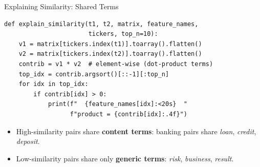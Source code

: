 \documentclass[aspectratio=169,11pt]{beamer}
\begin{document}
\begin{frame}[fragile]{Explaining Similarity: Shared Terms}

\begin{lstlisting}
def explain_similarity(t1, t2, matrix, feature_names,
                       tickers, top_n=10):
    v1 = matrix[tickers.index(t1)].toarray().flatten()
    v2 = matrix[tickers.index(t2)].toarray().flatten()
    contrib = v1 * v2  # element-wise (dot-product terms)
    top_idx = contrib.argsort()[::-1][:top_n]
    for idx in top_idx:
        if contrib[idx] > 0:
            print(f"  {feature_names[idx]:<20s}  "
                  f"product = {contrib[idx]:.4f}")
\end{lstlisting}

\vspace{6pt}
\begin{itemize}
  \item High-similarity pairs share \textbf{content terms}:
        banking pairs share \emph{loan}, \emph{credit},
        \emph{deposit}.
  \item Low-similarity pairs share only \textbf{generic terms}:
        \emph{risk}, \emph{business}, \emph{result}.
\end{itemize}

\end{frame}
\end{document}
